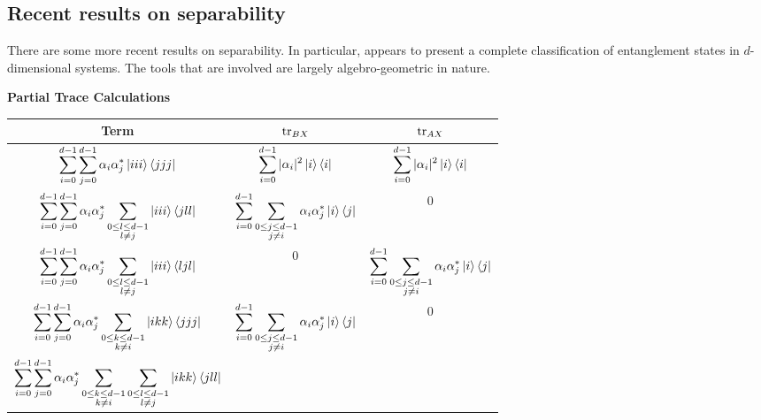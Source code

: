 \documentclass[reqno]{amsart}
\numberwithin{lemma}{section}
\numberwithin{proposition}{section}
\newcommand{\tr}{\textnormal{tr}}
\begin{document}
{\medskip

\subsection{Recent results on separability} 
There are some more recent results on separability. In particular, \cite{Gharahi2019FinestructureCO} appears to present a complete classification of entanglement states in $d$-dimensional systems. The tools that are involved are largely algebro-geometric in nature.

\newpage

\begin{center}
\textbf{Partial Trace Calculations}
\end{center}

\medskip

\begin{tabular}{|c|c|c|}
\hline
\textbf{Term} & $\tr_{BX}$ & $\tr_{AX}$\\
\hline
$\displaystyle \sum_{i=0}^{d-1} \sum_{j=0}^{d-1} \alpha_{i} \alpha_{j}^{*} \ket{iii}\bra{jjj}$ & $\displaystyle \sum_{i=0}^{d-1} \vert \alpha_{i} \vert^{2} \ket{i} \bra{i}$ & $\displaystyle \sum_{i=0}^{d-1} \vert \alpha_{i} \vert^{2} \ket{i} \bra{i}$\\
\hline
$\displaystyle \sum_{i=0}^{d-1} \sum_{j=0}^{d-1} \alpha_{i} \alpha_{j}^{*} \sum_{\substack{0 \leq l \leq d-1\\ l \neq j}} \ket{iii}\bra{jll}$ &
$\displaystyle \sum_{i=0}^{d-1} \sum_{\substack{0 \leq j \leq d-1\\ j \neq i}} \alpha_{i} \alpha_{j}^{*} \ket{i} \bra{j}$ &
$0$\\
\hline
$\displaystyle \sum_{i=0}^{d-1} \sum_{j=0}^{d-1} \alpha_{i} \alpha_{j}^{*} \sum_{\substack{0 \leq l \leq d-1\\ l \neq j}} \ket{iii} \bra{ljl}$ &
$\displaystyle 0$ &
$\displaystyle \sum_{i=0}^{d-1} \sum_{\substack{0 \leq j \leq d-1\\ j \neq i}} \alpha_{i} \alpha_{j}^{*} \ket{i}\bra{j}$\\
\hline
$\displaystyle \sum_{i=0}^{d-1} \sum_{j=0}^{d-1} \alpha_{i} \alpha_{j}^{*} \sum_{\substack{0 \leq k \leq d-1\\ k \neq i}} \ket{ikk}\bra{jjj}$ &
$\displaystyle \sum_{i=0}^{d-1} \sum_{\substack{0 \leq j \leq d-1\\ j \neq i}} \alpha_{i} \alpha_{j}^{*} \ket{i}\bra{j}$ & $0$\\
\hline
$\displaystyle \sum_{i=0}^{d-1} \sum_{j=0}^{d-1} \alpha_{i} \alpha_{j}^{*} \sum_{\substack{0 \leq k \leq d-1\\ k \neq i}} \sum_{\substack{0 \leq l \leq d-1\\ l \neq j}} \ket{ikk}\bra{jll}$ &

\end{tabular}}
\end{document}
